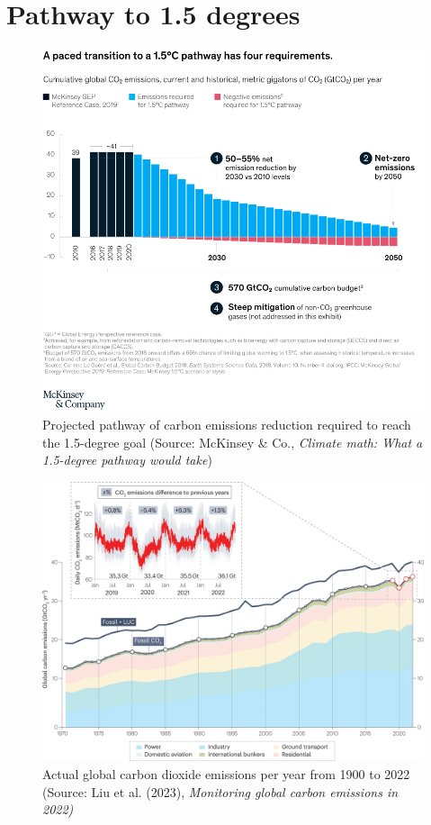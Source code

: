 \chapter{Pathway to 1.5 degrees}
\begin{figure}[ht!]
    \includegraphics[width=\textwidth]{figures/pathway.png}
    \caption{Projected pathway of carbon emissions reduction required to reach the 1.5-degree goal (Source: McKinsey \& Co., \textit{Climate math: What a 1.5-degree pathway would take})}
\end{figure}
\begin{figure}[ht!]
    \includegraphics[width=\textwidth]{figures/emissions.png}
    \caption{Actual global carbon dioxide emissions per year from 1900 to 2022 (Source: Liu et al. (2023), \textit{Monitoring global carbon emissions in 2022)}}
\end{figure}


